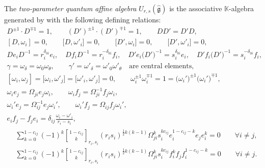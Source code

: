 \documentclass[pdftex]{sigma}
\numberwithin{equation}{section}
\newcommand{\qbinom}{\genfrac{[}{]}{0pt}{}}
\newcommand{\fg}{\mathfrak{g}}
\newcommand{\UU}{U_{r,s}(\widehat{\fg})}
\begin{document}
\begin{Definition}\label{def:2_param_aff}
The \textit{two-parameter quantum affine algebra} $\UU$ is the associative $\mathbb{K}$-algebra generated by
with the following defining relations:
\begin{gather}
 D^{\pm 1}\cdot D^{\mp 1}=1, \qquad (D')^{\pm 1}\cdot (D')^{\mp 1}=1, \qquad DD'=D'D, \nonumber\\
 [D,\omega_i]=0, \qquad \bigl[D,\omega'_i\bigr]=0, \qquad \bigl[D',\omega_i\bigr]=0, \qquad \bigl[D',\omega'_i\bigr]=0, \nonumber\\
 D e_i D^{-1}=r_i^{\delta_{0i}}e_i, \quad D f_i D^{-1}=r_i^{-\delta_{0i}}f_i, \quad
 D' e_i \bigl(D'\bigr)^{-1}=s_i^{\delta_{0i}}e_i, \quad D' f_i \bigl(D'\bigr)^{-1}=s_i^{-\delta_{0i}}f_i,\nonumber
\\ \label{eq:aR0}
 \gamma=\omega_{\delta}=\omega_0\omega_{\theta},\qquad \gamma'=\omega'_{\delta}=\omega'_0\omega'_{\theta}
\quad \text{are central\ elements},
\\ \label{eq:aR1}
 [\omega_i,\omega_j]=\big[\omega_i,\omega'_j\big]=\big[\omega'_i,\omega'_j\big]=0, \qquad
 \omega_{i}^{\pm 1}\omega_{i}^{\mp 1} = 1 = \bigl(\omega_{i}'\bigr)^{\pm 1}\bigl(\omega_{i}'\bigr)^{\mp 1},
\\ \label{eq:aR2}
 \omega_{i}e_{j} = \Omega_{ji} e_{j}\omega_{i}, \qquad
 \omega_{i}f_{j} = \Omega^{-1}_{ji} f_{j}\omega_{i},
\\ \label{eq:aR3}
 \omega_{i}'e_{j} = \Omega^{-1}_{ij} e_{j}\omega_{i}', \qquad
 \omega_{i}'f_{j} = \Omega_{ij} f_{j}\omega_{i}',
\\ \label{eq:aR4}
 e_{i}f_{j} - f_{j}e_{i} = \delta_{ij}\frac{\omega_i-\omega'_i}{r_{i} - s_{i}},
\\
\begin{aligned}
& \sum_{k = 0}^{1 - c_{ij}} (-1)^k \qbinom{1 - c_{ij}}{k}_{r_{i},s_{i}}
 (r_{i}s_{i})^{\frac{1}{2}k(k - 1)} \Omega_{ji}^{k} s_{i}^{kc_{ij}} e_{i}^{1 - c_{ij} - k}e_{j}e_{i}^{k} = 0
 \qquad \forall i\ne j, \\
& \sum_{k = 0}^{1 - c_{ij}} (-1)^k \qbinom{1 - c_{ij}}{k}_{r_{i},s_{i}}
 (r_{i}s_{i})^{\frac{1}{2}k(k - 1)} \Omega_{ji}^{k} s_{i}^{kc_{ij}} f_{i}^{k}f_{j}f_{i}^{1 - c_{ij} - k} = 0
 \qquad \forall i\ne j.
\end{aligned} \label{eq:aR5}
\end{gather}
\end{Definition}
\end{document}
